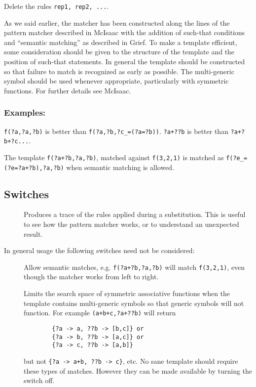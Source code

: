 Delete the rules \texttt{rep1, rep2, ...}.

As we said earlier, the matcher has been constructed along the lines of the
pattern matcher described in McIsaac with the addition of such-that conditions
and ``semantic matching'' as described in Grief.  To make a template efficient,
some consideration should be given to the structure of the template and the
position of such-that statements.  In general the template should be constructed
so that failure to match is recognized as early as possible.  The multi-generic
symbol should be used whenever appropriate, particularly with symmetric
functions.  For further details see McIsaac.

\subsubsection*{Examples:}

\texttt{f(?a,?a,?b)} is better than \texttt{f(?a,?b,?c\_=(?a=?b))}.
\texttt{?a+??b} is better than \texttt{?a+?b+?c...}.

The template \texttt{f(?a+?b,?a,?b)}, matched against \texttt{f(3,2,1)} is
matched as \texttt{f(?e\_=(?e=?a+?b),?a,?b)} when semantic matching is allowed.


\subsection{Switches}

\begin{description}
\item[]
  \hypertarget{switch:TRPM}{}%
  Produces a trace of the rules applied during a
    substitution.  This is useful to see how the pattern matcher works, or to
    understand an unexpected result.
\end{description}
In general usage the following switches need not be considered:
\begin{description}
\item[]
  \hypertarget{switch:SEMANTIC}{}%
  Allow semantic matches, e.g. \texttt{f(?a+?b,?a,?b)}
    will match \texttt{f(3,2,1)}, even though the matcher works from left to
    right.
  \item[]
  \hypertarget{switch:SYM!-ASSOC}{}%
    Limits the search space of symmetric associative
    functions when the template contains multi-generic symbols so that generic
    symbols will not function. For example \texttt{(a+b+c,?a+??b)} will return
      \begin{verbatim}
        {?a -> a, ??b -> [b,c]} or
        {?a -> b, ??b -> [a,c]} or
        {?a -> c, ??b -> [a,b]}
      \end{verbatim}
    but not \texttt{\{?a -> a+b, ??b -> c\}}, etc.  No sane template should
    require these types of matches.  However they can be made available by
    turning the switch off.
\end{description}
